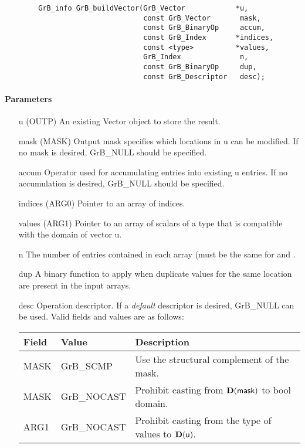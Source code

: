 \begin{verbatim}
        GrB_info GrB_buildVector(GrB_Vector            *u,
                                 const GrB_Vector       mask,
                                 const GrB_BinaryOp     accum,
                                 const GrB_Index       *indices,
                                 const <type>          *values,
                                 GrB_Index              n,
                                 const GrB_BinaryOp     dup,
                                 const GrB_Descriptor   desc);
\end{verbatim}

\paragraph{Parameters}

\begin{itemize}[leftmargin=1.1in]
    \item[{\sf u}]      ({\sf OUTP}) An existing Vector object to store the result.
    \item[{\sf mask}]   ({\sf MASK}) Output mask specifies which locations in
                        {\sf u} can be modified.  If no mask is desired,
                        {\sf GrB\_NULL} should be specified.
    \item[{\sf accum}]  Operator used for accumulating entries into existing
                        {\sf u} entries. If no accumulation is desired,
                        {\sf GrB\_NULL} should be specified.
    \item[{\sf indices}] ({\sf ARG0}) Pointer to an array of indices. 
    \item[{\sf values}] ({\sf ARG1}) Pointer to an array of scalars of a type that
                                     is compatible with the domain of vector {\sf u}.
    \item[{\sf n}]      The number of entries contained in each array (must be the same for  and .
    \item[{\sf dup}]    A binary function to apply when duplicate values for
                        the same location are present in the input arrays.
    \item[{\sf desc}]   Operation descriptor. If a
    \emph{default} descriptor is desired, {\sf GrB\_NULL} can be
    used.  Valid fields and values are as follows: \\
        \begin{tabular}{lll}
            Field  & Value & Description \\
            \hline
            {\sf MASK} & {\sf GrB\_SCMP}   & Use the structural complement of the mask. \\
            {\sf MASK} & {\sf GrB\_NOCAST} & Prohibit casting from $\bold{D}({\sf mask})$ to {\sf bool} domain. \\
            {\sf ARG1} & {\sf GrB\_NOCAST} & Prohibit casting from the type of {\sf values} to $\bold{D}(\arg{u})$. \\
        \end{tabular}
\end{itemize}

